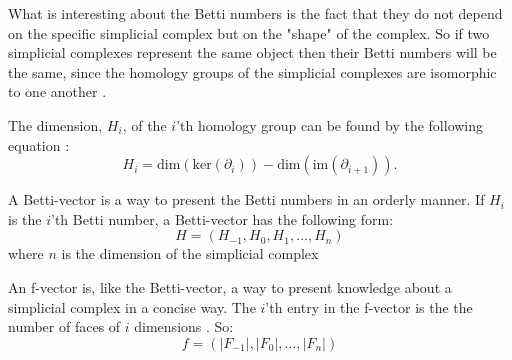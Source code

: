 \documentclass[11pt,a4paper,twoside]{report}
\begin{document}
What is interesting about the Betti numbers is the fact that they do not depend on the  specific simplicial complex but on the "shape" of the complex. So if two simplicial complexes represent the same object then their Betti numbers will be the same, since the homology groups of the simplicial complexes are isomorphic to one another \cite[p. 70]{Edelsbrunner}. 

The dimension, $H_i$, of the $i$'th homology group can be found by the following equation \cite[p.2]{Allgaier}:
\begin{equation*}
H_i = \textrm{dim}(\textrm{ker}(\partial_i))-\textrm{dim}(\textrm{im}(\partial_{i+1})).
\end{equation*}

A Betti-vector is a way to present the Betti numbers in an orderly manner. If $H_i$ is the $i$'th Betti number, a Betti-vector has the following form:
\begin{equation*}
H = (H_{-1},H_0,H_1,\dots,H_n)
\end{equation*}
where $n$ is the dimension of the simplicial complex

An f-vector is, like the Betti-vector, a way to present knowledge about a simplicial complex in a concise way. The $i$'th entry in the f-vector is the the number of faces of $i$ dimensions \cite[p.15]{Jonsson}. So:
\begin{equation*}
f = (|F_{-1}|,|F_0|,\dots,|F_n|)
\end{equation*}
\end{document}
